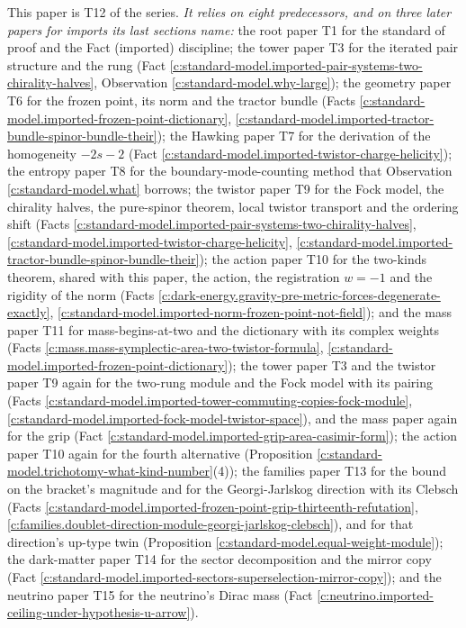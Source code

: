 \documentclass[11pt]{article}
\theoremstyle{definition}
\theoremstyle{plain}
\begin{document}
\label{c:note.standard-model.setting-position-series}
This paper is T12 of the series. \emph{It relies on eight predecessors, and on three later papers for imports its last sections name:} the root paper T1 \cite{ButlerT1} for the standard of proof and the Fact (imported) discipline; the tower paper T3 \cite{ButlerT3} for the iterated pair structure and the rung (Fact \ref{c:standard-model.imported-pair-systems-two-chirality-halves}, Observation \ref{c:standard-model.why-large}); the geometry paper T6 \cite{ButlerT6} for the frozen point, its norm and the tractor bundle (Facts \ref{c:standard-model.imported-frozen-point-dictionary}, \ref{c:standard-model.imported-tractor-bundle-spinor-bundle-their}); the Hawking paper T7 \cite{ButlerT7} for the derivation of the homogeneity $-2s-2$ (Fact \ref{c:standard-model.imported-twistor-charge-helicity}); the entropy paper T8 \cite{ButlerT8} for the boundary-mode-counting method that Observation \ref{c:standard-model.what} borrows; the twistor paper T9 \cite{ButlerT9} for the Fock model, the chirality halves, the pure-spinor theorem, local twistor transport and the ordering shift (Facts \ref{c:standard-model.imported-pair-systems-two-chirality-halves}, \ref{c:standard-model.imported-twistor-charge-helicity}, \ref{c:standard-model.imported-tractor-bundle-spinor-bundle-their}); the action paper T10 \cite{ButlerT10} for the two-kinds theorem, shared with this paper, the action, the registration $w = -1$ and the rigidity of the norm (Facts \ref{c:dark-energy.gravity-pre-metric-forces-degenerate-exactly}, \ref{c:standard-model.imported-norm-frozen-point-not-field}); and the mass paper T11 \cite{ButlerT11} for mass-begins-at-two and the dictionary with its complex weights (Facts \ref{c:mass.mass-symplectic-area-two-twistor-formula}, \ref{c:standard-model.imported-frozen-point-dictionary}); the tower paper T3 and the twistor paper T9 again for the two-rung module and the Fock model with its pairing (Facts \ref{c:standard-model.imported-tower-commuting-copies-fock-module}, \ref{c:standard-model.imported-fock-model-twistor-space}), and the mass paper again for the grip (Fact \ref{c:standard-model.imported-grip-area-casimir-form}); the action paper T10 again for the fourth alternative (Proposition \ref{c:standard-model.trichotomy-what-kind-number}(4)); the families paper T13 \cite{ButlerT13} for the bound on the bracket's magnitude and for the Georgi-Jarlskog direction with its Clebsch (Facts \ref{c:standard-model.imported-frozen-point-grip-thirteenth-refutation}, \ref{c:families.doublet-direction-module-georgi-jarlskog-clebsch}), and for that direction's up-type twin (Proposition \ref{c:standard-model.equal-weight-module}); the dark-matter paper T14 \cite{ButlerT14} for the sector decomposition and the mirror copy (Fact \ref{c:standard-model.imported-sectors-superselection-mirror-copy}); and the neutrino paper T15 \cite{ButlerT15} for the neutrino's Dirac mass (Fact \ref{c:neutrino.imported-ceiling-under-hypothesis-u-arrow}).
\end{document}
